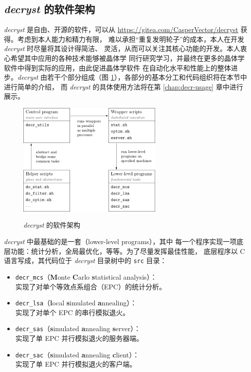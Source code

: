 \subsection{\emph{decryst} 的软件架构}\label{ssec:decr-arch}

\emph{decryst} 是自由、开源的软件，可以从
\url{https://gitea.com/CasperVector/decryst} 获得。考虑到本人能力和精力有限，
难以承担“重复发明轮子”的成本，本人在开发 \emph{decryst} 时尽量将其设计得简洁、
灵活，从而可以关注其核心功能的开发。本人衷心希望其中应用的各种技术能够被晶体学
同行研究学习，并最终在更多的晶体学软件中得到实际的应用，由此促进晶体学软件
在自动化水平和性能上的整体进步。\emph{decryst} 由若干个部分组成（图
\ref{fig:decr-arch}），各部分的基本分工和代码组织将在本节中进行简单的介绍，
而 \emph{decryst} 的具体使用方法将在第 \ref{chap:decr-usage} 章中进行展示。

\begin{figure}[htbp!]\bfcmd
\ffigbox%
	{\includegraphics[width = 0.64\textwidth]{img/decr-arch}}
	{\caption{\emph{decryst} 的软件架构}\label{fig:decr-arch}}
\end{figure}

\emph{decryst} 中最基础的是一套（lower-level programs），其中
每一个程序实现一项底层功能：统计分析，全局最优化，等等。为了尽量发挥最佳性能，
底层程序以 C 语言写成，其代码位于 \emph{decryst} 目录树中的 \verb|src| 目录：
\begin{itemize}
\item \verb|decr_mcs|（\textbf{M}onte \textbf{C}arlo \textbf{s}tatistical
	analysis）：\\实现了对单个等效点系组合（EPC）的统计分析。
\item \verb|decr_lsa|（\textbf{l}ocal \textbf{s}imulated
	\textbf{a}nnealing）：\\实现了对单个 EPC 的串行模拟退火。
\item \verb|decr_sas|（\textbf{s}imulated \textbf{a}nnealing
	\textbf{s}erver）：\\实现了单 EPC 并行模拟退火的服务器端。
\item \verb|decr_sac|（\textbf{s}imulated \textbf{a}nnealing
	\textbf{c}lient）：\\实现了单 EPC 并行模拟退火的客户端。
\end{itemize}

